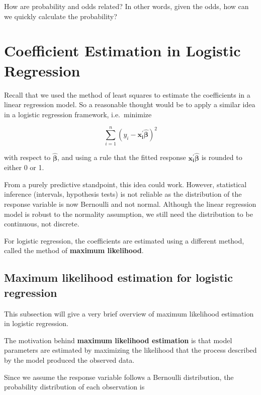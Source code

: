 \documentclass[
]{book}
\begin{document}
How are probability and odds related? In other words, given the odds, how can we quickly calculate the probability?

\hypertarget{coefficient-estimation-in-logistic-regression}{%
\section{Coefficient Estimation in Logistic Regression}\label{coefficient-estimation-in-logistic-regression}}

Recall that we used the method of least squares to estimate the coefficients in a linear regression model. So a reasonable thought would be to apply a similar idea in a logistic regression framework, i.e.~minimize

\[
\sum_{i=1}^n (y_i - \boldsymbol{x_i^{\prime} \hat{\beta}})^2
\]

with respect to \(\boldsymbol{\hat{\beta}}\), and using a rule that the fitted response \(\boldsymbol{x_i^{\prime} \hat{\beta}}\) is rounded to either 0 or 1.

From a purely predictive standpoint, this idea could work. However, statistical inference (intervals, hypothesis tests) is not reliable as the distribution of the response variable is now Bernoulli and not normal. Although the linear regression model is robust to the normality assumption, we still need the distribution to be continuous, not discrete.

For logistic regression, the coefficients are estimated using a different method, called the method of \textbf{maximum likelihood}.

\hypertarget{maximum-likelihood-estimation-for-logistic-regression}{%
\subsection{Maximum likelihood estimation for logistic regression}\label{maximum-likelihood-estimation-for-logistic-regression}}

This subsection will give a very brief overview of maximum likelihood estimation in logistic regression.

The motivation behind \textbf{maximum likelihood estimation} is that model parameters are estimated by maximizing the likelihood that the process described by the model produced the observed data.

Since we assume the response variable follows a Bernoulli distribution, the probability distribution of each observation is
\end{document}
